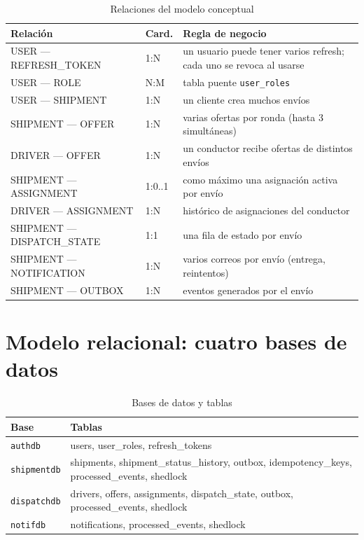 \documentclass[10pt,letterpaper,twocolumn,oneside]{report}
\newcommand{\pkg}[1]{\texttt{#1}}
\begin{document}
\begin{table}[t]
\centering
\caption{Relaciones del modelo conceptual}
\small
\begin{tabular}{@{}L{4.6cm}L{1.6cm}L{6.6cm}@{}}
\toprule
\textbf{Relación} & \textbf{Card.} & \textbf{Regla de negocio}\\
\midrule
USER — REFRESH\_TOKEN & 1:N & un usuario puede tener varios refresh; cada uno se revoca al usarse\\
USER — ROLE & N:M & tabla puente \pkg{user\_roles}\\
USER — SHIPMENT & 1:N & un cliente crea muchos envíos\\
SHIPMENT — OFFER & 1:N & varias ofertas por ronda (hasta 3 simultáneas)\\
DRIVER — OFFER & 1:N & un conductor recibe ofertas de distintos envíos\\
SHIPMENT — ASSIGNMENT & 1:0..1 & como máximo una asignación activa por envío\\
DRIVER — ASSIGNMENT & 1:N & histórico de asignaciones del conductor\\
SHIPMENT — DISPATCH\_STATE & 1:1 & una fila de estado por envío\\
SHIPMENT — NOTIFICATION & 1:N & varios correos por envío (entrega, reintentos)\\
SHIPMENT — OUTBOX & 1:N & eventos generados por el envío\\
\bottomrule
\end{tabular}
\end{table}

\section{Modelo relacional: cuatro bases de datos}

\begin{table}[t]
\centering
\caption{Bases de datos y tablas}
\small
\begin{tabular}{@{}L{2.6cm}L{11.4cm}@{}}
\toprule
\textbf{Base} & \textbf{Tablas}\\
\midrule
\pkg{authdb} & users, user\_roles, refresh\_tokens\\
\pkg{shipmentdb} & shipments, shipment\_status\_history, outbox, idempotency\_keys,
processed\_events, shedlock\\
\pkg{dispatchdb} & drivers, offers, assignments, dispatch\_state, outbox, processed\_events, shedlock\\
\pkg{notifdb} & notifications, processed\_events, shedlock\\
\bottomrule
\end{tabular}
\end{table}
\end{document}
